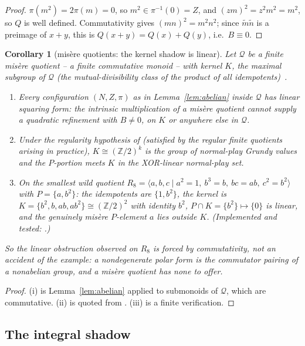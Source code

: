 \documentclass[11pt]{article}
\theoremstyle{plain}
\newtheorem{corollary}{Corollary}
\theoremstyle{definition}
\begin{document}
\begin{proof}
$\pi(m^2)=2\pi(m)=0$, so $m^2\in\pi^{-1}(0)=Z$, and
$(zm)^2=z^2m^2=m^2$, so $Q$ is well defined. Commutativity gives
$(mn)^2=m^2n^2$; since $\tilde m\tilde n$ is a preimage of $x+y$, this is
$Q(x+y)=Q(x)+Q(y)$, i.e.\ $B\equiv0$.
\end{proof}

\begin{corollary}[misère quotients: the kernel shadow is linear]\label{cor:kernel}
Let $\mathcal{Q}$ be a finite misère quotient -- a finite commutative
monoid -- with kernel $K$, the maximal subgroup of $\mathcal{Q}$ (the
mutual-divisibility class of the product of all idempotents)~\cite{PS}.
\begin{enumerate}[label=(\roman*),leftmargin=*]
\item Every configuration $(N,Z,\pi)$ as in Lemma~\ref{lem:abelian} inside
$\mathcal{Q}$ has linear squaring form: the intrinsic multiplication of a
misère quotient cannot supply a quadratic refinement with $B\neq0$, on $K$
or anywhere else in $\mathcal{Q}$.
\item Under the regularity hypothesis of \cite[Thm.~6.4]{PS} (satisfied by
the regular finite quotients arising in practice), $K\cong(\mathbb{Z}/2)^k$
is the group of normal-play Grundy values and the $P$-portion meets $K$ in
the XOR-linear normal-play set.
\item On the smallest wild quotient
$R_8=\langle a,b,c\mid a^2=1,\ b^3=b,\ bc=ab,\ c^2=b^2\rangle$ with
$P=\{a,b^2\}$: the idempotents are $\{1,b^2\}$, the kernel is
$K=\{b^2,b,ab,ab^2\}\cong(\mathbb{Z}/2)^2$ with identity $b^2$,
$P\cap K=\{b^2\}\mapsto\{0\}$ is linear, and the genuinely misère
$P$-element $a$ lies outside $K$. (Implemented and tested:
.)
\end{enumerate}
So the linear obstruction observed on $R_8$ is forced by commutativity, not
an accident of the example: a nondegenerate polar form is the commutator
pairing of a nonabelian group, and a misère quotient has none to offer.
\end{corollary}

\begin{proof}
(i) is Lemma~\ref{lem:abelian} applied to submonoids of $\mathcal{Q}$,
which are commutative. (ii) is quoted from \cite{PS}. (iii) is a finite
verification.
\end{proof}

\subsection{The integral shadow}\label{sec:integral}
\end{document}
